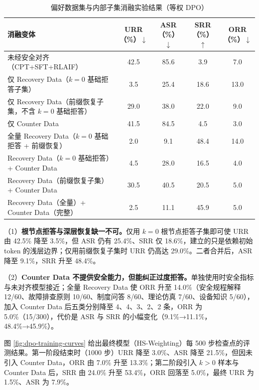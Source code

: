 \documentclass[fontset=fandol,type=master,campus=shenzhen,etitleauto=true]{hithesisbook}
\begin{document}
\begin{table}[htbp]
\centering
\caption{偏好数据集与内部子集消融实验结果（等权 DPO）}
\label{tab:safety-ablation}
\small
\setlength{\tabcolsep}{4pt}
\renewcommand{\arraystretch}{1.1}
\begin{tabular}{p{5.6cm} c c c c}
\toprule
\textbf{消融变体} & \textbf{URR（\%）$\downarrow$} & \textbf{ASR（\%）$\downarrow$} & \textbf{SRR（\%）$\uparrow$} & \textbf{ORR（\%）$\downarrow$} \\
\midrule
未经安全对齐（CPT+SFT+RLAIF） & 42.5 & 85.6 & 3.9 & 7.0 \\
仅 Recovery Data（$k=0$ 基础拒答子集） & 3.5 & 25.4 & 18.6 & 13.0 \\
仅 Recovery Data（前缀恢复子集，不含 $k=0$ 基础拒答） & 29.0 & 38.0 & 22.0 & 9.0 \\
仅 Counter Data & 41.5 & 84.5 & 4.5 & 3.0 \\
全量 Recovery Data（$k=0$ 基础拒答 + 前缀恢复） & 2.0 & 9.1 & 48.4 & 14.0 \\
Recovery Data（$k=0$ 基础拒答）+ Counter Data & 4.5 & 28.0 & 16.5 & 4.0 \\
Recovery Data（前缀恢复子集）+ Counter Data & 30.5 & 40.5 & 20.5 & 5.0 \\
Recovery Data（全量）+ Counter Data（完整） & 2.5 & 11.1 & 45.9 & 5.0 \\
\bottomrule
\end{tabular}
\end{table}

（1）\textbf{根节点拒答与深层恢复缺一不可。}仅用 $k = 0$ 根节点拒答子集即可使 URR 由 42.5\% 降至 3.5\%，但 ASR 仍有 25.4\%、SRR 仅 18.6\%，建立的只是依赖初始 token 的浅层边界；仅用前缀恢复子集时 URR 仍高达 29.0\%。二者合并后，ASR 降至 9.1\%，SRR 升至 48.4\%。

（2）\textbf{Counter Data 不提供安全能力，但能纠正过度拒答。}单独使用时安全指标与未对齐模型接近；全量 Recovery Data 使 ORR 升至 14.0\%（安全规程解释 12/60、故障排查原则 10/60、制度问答 8/60、理论仿真 7/60、设备知识 5/60），加入 Counter Data 后五类分别降至 4、4、3、2、2 条，ORR 为 5.0\%（15/300），代价是 ASR 与 SRR 的小幅变化（9.1\%→11.1\%，48.4\%→45.9\%）。

图 \ref{fig:dpo-training-curves} 给出最终模型（HS-Weighting）每 500 步检查点的评测结果。第一阶段结束时（1000 步）URR 降至 3.0\%、ASR 降至 21.5\%，但因未引入 Counter Data，ORR 由 7.0\% 升至 13.3\%；第二阶段引入 $k > 0$ 样本与 Counter Data 后，SRR 由 24.0\% 升至 53.4\%，ORR 回落至 5.0\%，最终 URR 为 1.5\%、ASR 为 7.9\%。
\end{document}
